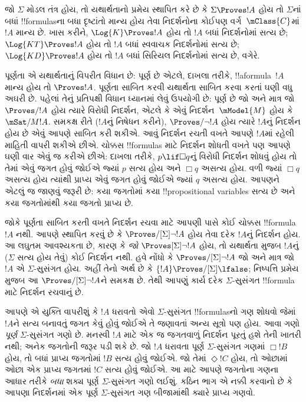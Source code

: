 \documentclass[../../../include/open-logic-section]{subfiles}
\begin{document}


જો $\Sigma$ મોડલ તંત્ર હોય, તો યથાર્થતાનો પ્રમેય સ્થાપિત કરે છે કે
$\Sigma \Proves !A$ હોય તો $\Sigma$નાં બધાં !!{formula}sના બધા
દૃષ્ટાંતો માન્ય હોય તેવા નિદર્શનોના કોઈપણ વર્ગ~$\mClass{C}$માં
$!A$ માન્ય છે. ખાસ કરીને, $\Log{K} \Proves !A$ હોય તો $!A$ બધાં
નિદર્શનોમાં સત્ય છે; $\Log{KT} \Proves !A$ હોય તો $!A$ બધાં
સ્વવાચક નિદર્શનોમાં સત્ય છે; $\Log{KD} \Proves !A$ હોય તો
$!A$ બધાં સિરિયલ નિદર્શનોમાં સત્ય છે, વગેરે.

પૂર્ણતા એ યથાર્થતાનું વિપરીત વિધાન છે:  પૂર્ણ છે એટલે, દાખલા
તરીકે, !!a{formula}~$!A$ માન્ય હોય તો $\Proves !A$. પૂર્ણતા
સાબિત કરવી યથાર્થતા સાબિત કરવા કરતાં ઘણી વધુ અઘરી છે. પહેલાં તેનું
પ્રતિપક્ષી વિધાન ધ્યાનમાં લેવું ઉપયોગી છે:  પૂર્ણ છે જો અને
માત્ર જો $\Proves/ !A$ હોય ત્યારે વિરોધી નિદર્શન, એટલે કે એવું
નિદર્શન~$\mModel{M}$ હોય કે $\mSat/{M}{!A}$. સમકક્ષ રીતે ($!A$નું
નિષેધન કરીને), $\Proves/ \lnot !A$ હોય ત્યારે $!A$નું નિદર્શન
હોય છે એવું આપણે સાબિત કરી શકીએ. આવું નિદર્શન રચતી વખતે આપણે
$!A$માં રહેલી માહિતી વાપરી શકીએ છીએ. ચોક્કસ !!{formula}s માટે
નિદર્શન શોધતી વખતે પણ આપણે ઘણી વાર એવું જ કરીએ છીએ: દાખલા તરીકે,
$p \lif \Box q$નું વિરોધી નિદર્શન શોધવું હોય તો તેમાં એવું જગત
હોવું જોઈએ જ્યાં $p$ સત્ય હોય અને $\Box q$ અસત્ય હોય. વળી જ્યાં
$\Box q$ અસત્ય હોય ત્યાંથી પ્રાપ્ય એવું જગત હોવું જોઈએ જ્યાં $q$
અસત્ય હોય. આપણને એટલું જ જાણવું જરૂરી છે: કયા જગતોમાં કયા
!!{propositional variable}s સત્ય છે અને કયા જગતોમાંથી કયા જગતો
પ્રાપ્ય છે.

જોકે પૂર્ણતા સાબિત કરતી વખતે નિદર્શન રચવા માટે આપણી પાસે કોઈ
ચોક્કસ !!{formula}~$!A$ નથી. આપણે સ્થાપિત કરવું છે કે
$\Proves/[\Sigma] \lnot !A$ હોય તેવા દરેક $!A$નું નિદર્શન હોય.
આ લઘુતમ આવશ્યકતા છે, કારણ કે \emph{જો} $\Proves[\Sigma] \lnot !A$
હોય, તો યથાર્થતા મુજબ $!A$નું ($\Sigma$ સત્ય હોય તેવું) કોઈ
નિદર્શન નથી. હવે નોંધો કે $\Proves/[\Sigma] \lnot !A$ જો અને માત્ર
જો $!A$ એ $\Sigma$-સુસંગત હોય. અહીં તેનો અર્થ છે કે
$\{!A\} \Proves/[\Sigma] \lfalse$; નિષ્પત્તિ પ્રમેય મુજબ આ
$\Proves/[\Sigma] \lnot !A$ને સમકક્ષ છે. તેથી આપણું કાર્ય દરેક $\Sigma$-સુસંગત !!{formula}
માટે નિદર્શન રચવાનું છે.


આપણે એ યુક્તિ વાપરીશું કે $!A$ ધરાવતો એવો $\Sigma$-સુસંગત
!!{formula}sનો ગણ શોધવો જેમાં $!A$ને સત્ય બનાવતું જગત કેવું હોવું
જોઈએ તે જણાવતાં અન્ય સૂત્રો પણ હોય. આવા ગણો \emph{પૂર્ણ}
$\Sigma$-સુસંગત ગણો છે. મનસ્વી $!A$ માટે એક જ જગતવાળું નિદર્શન
પૂરતું હશે તેની ખાતરી નથી; અનેક જગતોની જરૂર પડી શકે છે.
જો $!A$ ધરાવતા પૂર્ણ $\Sigma$-સુસંગત ગણમાં $\Box !B$ હોય,
તો બધાં પ્રાપ્ય જગતોમાં $!B$ સત્ય હોવું જોઈએ. જો તેમાં
$\Diamond !C$ હોય, તો ઓછામાં ઓછા એક પ્રાપ્ય જગતમાં $!C$ સત્ય
હોવું જોઈએ. આ માટે આપણે જગતોના ગણના આધાર તરીકે \emph{બધા}
શક્ય પૂર્ણ $\Sigma$-સુસંગત ગણો લઈશું. કઠિન ભાગ એ નક્કી કરવાનો
છે કે આપણા નિદર્શનમાં એક પૂર્ણ $\Sigma$-સુસંગત ગણ બીજામાંથી
ક્યારે પ્રાપ્ય ગણવો.
\end{document}
